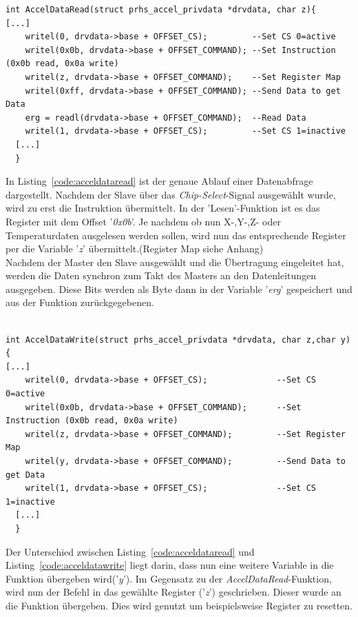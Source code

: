 \begin{lstlisting}[caption={Funktion zum Lesen von Daten},label={code:acceldataread}]
  int AccelDataRead(struct prhs_accel_privdata *drvdata, char z){
[...]
  	writel(0, drvdata->base + OFFSET_CS);         --Set CS 0=active
    writel(0x0b, drvdata->base + OFFSET_COMMAND); --Set Instruction (0x0b read, 0x0a write)
  	writel(z, drvdata->base + OFFSET_COMMAND);    --Set Register Map
  	writel(0xff, drvdata->base + OFFSET_COMMAND); --Send Data to get Data
  	erg = readl(drvdata->base + OFFSET_COMMAND);  --Read Data
  	writel(1, drvdata->base + OFFSET_CS);         --Set CS 1=inactive
  [...]
  }
 \end{lstlisting}

In Listing~\ref{code:acceldataread} ist der genaue Ablauf einer Datenabfrage dargestellt. Nachdem der Slave über
das \emph{Chip-Select}-Signal ausgewählt wurde, wird zu erst die Instruktion übermittelt. In der 'Lesen'-Funktion
ist es das Register mit dem Offset '\emph{0x0b}'. Je nachdem ob nun X-,Y-,Z- oder Temperaturdaten
ausgelesen werden sollen, wird nun das entsprechende Register per die Variable '\emph{z}' übermittelt.(Register Map siehe Anhang)\\
Nachdem der Master den Slave ausgewählt und die Übertragung eingeleitet hat, werden die Daten synchron zum Takt des Masters
an den Datenleitungen ausgegeben. Diese Bits werden als Byte dann
in der Variable '\emph{erg}' gespeichert und aus der Funktion zurückgegebenen. \\\\

\begin{lstlisting}[caption={Funktion zum Schreiben von Daten},label={code:acceldatawrite}]
  int AccelDataWrite(struct prhs_accel_privdata *drvdata, char z,char y){
[...]
  	writel(0, drvdata->base + OFFSET_CS);              --Set CS 0=active
    writel(0x0b, drvdata->base + OFFSET_COMMAND);      --Set Instruction (0x0b read, 0x0a write)
  	writel(z, drvdata->base + OFFSET_COMMAND);         --Set Register Map
    writel(y, drvdata->base + OFFSET_COMMAND);         --Send Data to get Data
  	writel(1, drvdata->base + OFFSET_CS);              --Set CS 1=inactive
  [...]
  }
 \end{lstlisting}

Der Unterschied zwischen Listing~\ref{code:acceldataread} und Listing~\ref{code:acceldatawrite} liegt darin, dass
nun eine weitere Variable in die Funktion übergeben wird('\emph{y}'). Im Gegensatz zu der \emph{AccelDataRead}-Funktion,
wird nun der Befehl in das gewählte Register ('\emph{z}') geschrieben. Dieser wurde an die Funktion übergeben. Dies wird
genutzt um beispielsweise Register zu resetten.\cite{accelerometer}\\

